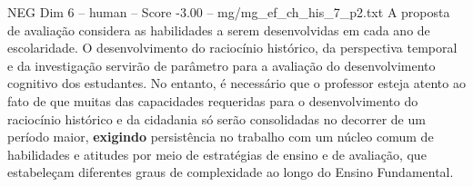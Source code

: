 \begin{textsample}{NEG Dim 6 – human – Score -3.00 – mg/mg\_ef\_ch\_his\_7\_p2.txt}  \label{ex:f6_neg_003}
A proposta de avaliação considera as habilidades a serem desenvolvidas em cada ano de escolaridade.
O desenvolvimento do raciocínio histórico, da perspectiva temporal e da investigação servirão de parâmetro para a avaliação do desenvolvimento cognitivo dos estudantes.
No entanto, é necessário que o professor esteja atento ao fato de que muitas das capacidades requeridas para o desenvolvimento do raciocínio histórico e da cidadania só serão consolidadas no decorrer de um período maior, \textbf{exigindo} persistência no trabalho com um núcleo comum de habilidades e atitudes por meio de estratégias de ensino e de avaliação, que estabeleçam diferentes graus de complexidade ao longo do Ensino Fundamental.

\end{textsample}
